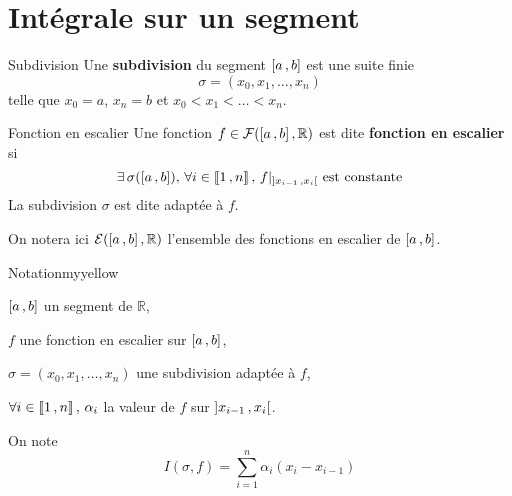 
\section{Intégrale sur un segment}

    \begin{defi}{Subdivision}{}
        Une \textbf{subdivision} du segment $\left[ a \, , b \right]$ est une suite finie 
        \[ \sigma =  (x_0, x_1,\ldots,x_n) \] telle que $x_0 = a$, $x_n = b$ et $x_0 < x_1 < \ldots < x_n$.
    \end{defi}

    \begin{defi}{Fonction en escalier}{}
        Une fonction $f \in \mathcal{F}(\left[ a \, , b \right], \mathbb{R})$ est dite \textbf{fonction en escalier} si 
        \[ \exists \, \sigma(\left[ a \, , b \right]), \, \forall i \in \left\llbracket 1 \, , n \right\rrbracket, \, f \vert_{\left] x_{i-1} \, , x_i \right[} \text{ est constante} \]
        La subdivision $\sigma$ est dite adaptée à $f$. 
        
        On notera ici $\mathcal{E}(\left[ a \, , b \right],\mathbb{R})$ l’ensemble des fonctions en escalier de $\left[ a \, , b \right]$.
    \end{defi}

    \begin{omed}{Notation}{myyellow}
        \begin{soient} 
            \item $\left[ a \, , b \right]$ un segment de $\mathbb{R}$,
            \item $f$ une fonction en escalier sur $\left[ a \, , b \right]$,
            \item $\sigma = (x_0,x_1,\ldots,x_n)$ une subdivision adaptée à $f$,
            \item $\forall i \in \left\llbracket 1 \, , n \right\rrbracket, \, \alpha_i$ la valeur de $f$ sur $\left] x_{i-1} \, , x_i \right[$.
        \end{soient}
        On note 
        \[  I(\sigma,f) = \sum\limits_{i=1}^n \alpha_i (x_i - x_{i-1}) \]
    \end{omed}

